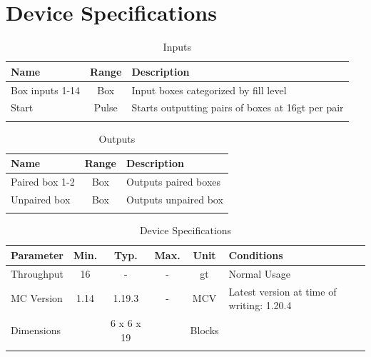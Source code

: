 \documentclass[10pt]{datasheet}
\begin{document}
\onecolumn

\section{Device Specifications}

\begin{table}[h]
    \caption{Inputs}
    \begin{tabularx}{\textwidth}{l | c | X}
        \thickhline
        \textbf{Name} & \textbf{Range} & \textbf{Description} \\
        \hline
        Box inputs 1-14 & Box & Input boxes categorized by fill level  \\
        \hline
        Start & Pulse & Starts outputting pairs of boxes at 16gt per pair  \\
        \thickhline
\end{tabularx}
\end{table}

\begin{table}[h]
    \caption{Outputs}
    \begin{tabularx}{\textwidth}{l | c | X}
        \thickhline
        \textbf{Name} & \textbf{Range} & \textbf{Description} \\
        \hline
        Paired box 1-2 & Box & Outputs paired boxes \\
        \hline
        Unpaired box & Box & Outputs unpaired box \\
        \thickhline
\end{tabularx}
\end{table}

\begin{table}[h]
    \caption{Device Specifications}
    \begin{tabularx}{\textwidth}{l | c c c | c | X}
        \thickhline
        \textbf{Parameter} & \textbf{Min.} & \textbf{Typ.} & \textbf{Max.} &
        \textbf{Unit} & \textbf{Conditions} \\
        \hline
        Throughput  & 16 & - & - & gt & Normal Usage \\
        \hline
        MC Version & 1.14 & 1.19.3 & - & MCV & Latest version at time of writing: 1.20.4\\
        \hline
        Dimensions & & 6 x 6 x 19 & & Blocks & \\
        \thickhline
\end{tabularx}
\end{table}
\newpage
\end{document}
